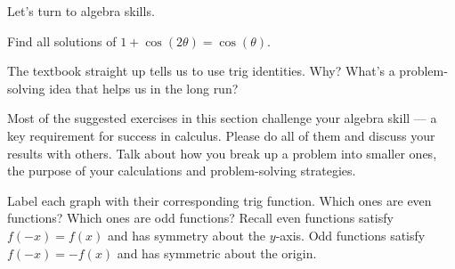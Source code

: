\documentclass[../main.tex]{subfiles}
\begin{document}
\clearpage

Let's turn to algebra skills.
\begin{example}
  Find all solutions of \(1 + \cos(2 \theta) = \cos(\theta)\).

  {\scriptsize The textbook straight up tells us to use trig identities. Why? What's a  problem-solving idea that helps us in the long run?}

\end{example}

\faExclamationTriangle{} Most of the suggested exercises in this section challenge your algebra skill --- a key requirement for success in calculus. Please do all of them and discuss your results with others. Talk about how you break up a problem into smaller ones, the purpose of your calculations and problem-solving strategies. 
\clearpage

\begin{exercise}
  Label each graph with their corresponding trig function. Which ones are even functions? Which ones are odd functions?  \newline
  {\footnotesize Recall even functions satisfy \(f(-x) = f(x)\) and has symmetry about the \(y\)-axis. Odd functions satisfy \(f(-x) = -f(x)\) and has symmetric about the origin.}
  \bigskip

  \begin{center}
    
    \hfill\vline\hfill
    
  \end{center}
  \vfill{}

  \begin{center}
    
    \hfill\vline\hfill
    
  \end{center}
  \vfill{}

  \begin{center}
    
    \hfill\vline\hfill
    
  \end{center}
  \vfill{}
\end{exercise}
\end{document}
